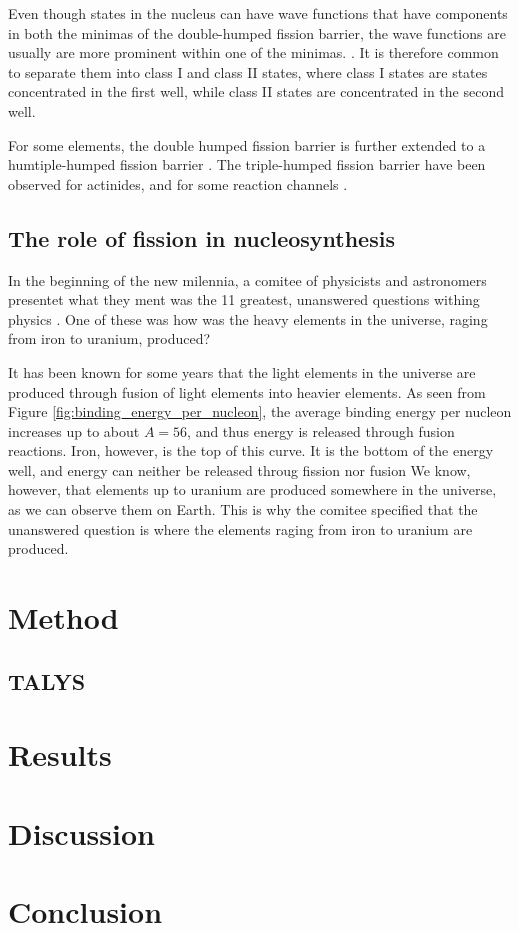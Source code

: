 \documentclass[]{article}
\begin{document}
\noindent Even though states in the nucleus can have wave functions that have components in both the minimas of the double-humped fission barrier, the wave functions are usually are more prominent within one of the minimas. \cite{Wagemas1991}. It is therefore common to separate them into class I and class II states, where class I states are states concentrated in the first well, while class II states are concentrated in the second well. 

For some elements, the double humped fission barrier is further extended to a humtiple-humped fission barrier \cite{Goriely2017}. The triple-humped fission barrier have been observed for actinides, and for some reaction channels \cite{PhysRevC.74.014608}.
 
\subsection{The role of fission in nucleosynthesis}
In the beginning of the new milennia, a comitee of physicists and astronomers presentet what they ment was the 11 greatest, unanswered questions withing physics \cite{Haseltine2002}. One of these was how was the heavy elements in the universe, raging from iron to uranium, produced?

\par 
\vspace{3mm}
It has been known for some years that the light elements in the universe are produced through fusion of light elements into heavier elements. As seen from Figure \ref{fig:binding_energy_per_nucleon}, the average binding energy per nucleon increases up to about $A = 56$, and thus energy is released through fusion reactions. Iron, however, is the top of this curve. It is the bottom of the energy well, and energy can neither be released throug fission nor fusion We know, however, that elements up to uranium are produced somewhere in the universe, as we can observe them on Earth. This is why the comitee specified that the unanswered question is where the elements raging from iron to uranium are produced. 


\section{Method}

\subsection{TALYS}


\section{Results}

\section{Discussion}

\section{Conclusion}



 
\end{document}
